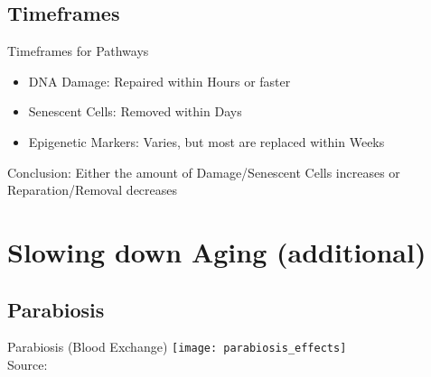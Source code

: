 \subsection{Timeframes}

\begin{frame}[c]{Timeframes for Pathways}
    \large
    \begin{itemize}[<+(1)->]
        \item DNA Damage: Repaired within Hours or faster \cite{frankenberg1989review}
        \item Senescent Cells: Removed within Days \cite{karin2018senescent}
        \item Epigenetic Markers: Varies, but most are replaced within Weeks \cite{ginno2020genome} \cite{yamagata2012rapid}
    \end{itemize}
    \pause
    Conclusion: Either the amount of Damage/Senescent Cells increases or Reparation/Removal decreases
\end{frame}




\section{Slowing down Aging (additional)}

\subsection{Parabiosis}

\begin{frame}[c]{Parabiosis (Blood Exchange)}
    \scriptsize
    \texttt{[image: parabiosis\_effects]} \\
    Source: \cite{conese2017fountain}
\end{frame}

